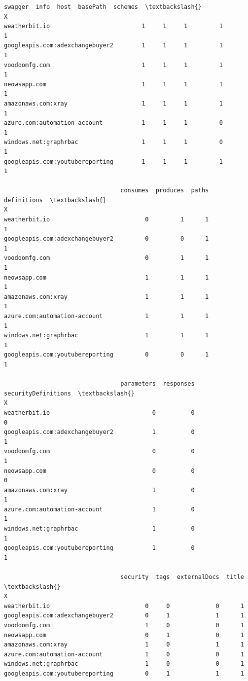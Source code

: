 \documentclass[11pt]{article}
\begin{document}
    \begin{Verbatim}[commandchars=\\\{\}]
                                 swagger  info  host  basePath  schemes  \textbackslash{}
X                                                                         
weatherbit.io                          1     1     1         1        1   
googleapis.com:adexchangebuyer2        1     1     1         1        1   
voodoomfg.com                          1     1     1         1        1   
neowsapp.com                           1     1     1         1        1   
amazonaws.com:xray                     1     1     1         1        1   
azure.com:automation-account           1     1     1         0        1   
windows.net:graphrbac                  1     1     1         0        1   
googleapis.com:youtubereporting        1     1     1         1        1   

                                 consumes  produces  paths  definitions  \textbackslash{}
X                                                                         
weatherbit.io                           0         1      1            1   
googleapis.com:adexchangebuyer2         0         0      1            1   
voodoomfg.com                           0         1      1            1   
neowsapp.com                            1         1      1            1   
amazonaws.com:xray                      1         1      1            1   
azure.com:automation-account            1         1      1            1   
windows.net:graphrbac                   1         1      1            1   
googleapis.com:youtubereporting         0         0      1            1   

                                 parameters  responses  securityDefinitions  \textbackslash{}
X                                                                             
weatherbit.io                             0          0                    0   
googleapis.com:adexchangebuyer2           1          0                    1   
voodoomfg.com                             0          0                    1   
neowsapp.com                              0          0                    0   
amazonaws.com:xray                        1          0                    1   
azure.com:automation-account              1          0                    1   
windows.net:graphrbac                     1          0                    1   
googleapis.com:youtubereporting           1          0                    1   

                                 security  tags  externalDocs  title  \textbackslash{}
X                                                                      
weatherbit.io                           0     0             0      1   
googleapis.com:adexchangebuyer2         0     1             1      1   
voodoomfg.com                           1     0             0      1   
neowsapp.com                            0     1             0      1   
amazonaws.com:xray                      1     0             1      1   
azure.com:automation-account            1     0             0      1   
windows.net:graphrbac                   1     0             0      1   
googleapis.com:youtubereporting         0     1             1      1   


\end{Verbatim}
\end{document}

